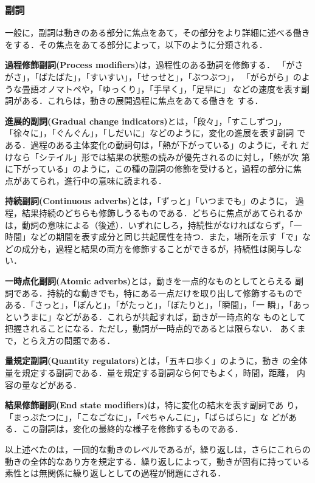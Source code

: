 \subsubsection{副詞}
\label{fukushi}

一般に，副詞は動きのある部分に焦点をあて，その部分をより詳細に述べる働き
をする．その焦点をあてる部分によって，以下のように分類される\cite{森山
  88}．

{\bf 過程修飾副詞(Process modifiers)}は，過程性のある動詞を修飾する．
「がさがさ」，「ばたばた」，「すいすい」，「せっせと」，「ぶつぶつ」，
「がらがら」のような畳語オノマトペや，「ゆっくり」，「手早く」，「足早に」
などの速度を表す副詞がある．これらは，動きの展開過程に焦点をあてる働きを
する．

{\bf 進展的副詞(Gradual change indicators)}とは，「段々」，「すこしずつ」，
「徐々に」，「ぐんぐん」，「しだいに」などのように，変化の進展を表す副詞
である．過程のある主体変化の動詞句は，「熱が下がっている」のように，それ
だけなら「シテイル」形では結果の状態の読みが優先されるのに対し，「熱が次
第に下がっている」のように，この種の副詞の修飾を受けると，過程の部分に焦
点があてられ，進行中の意味に読まれる．

{\bf 持続副詞(Continuous adverbs)}とは，「ずっと」「いつまでも」のように，
過程，結果持続のどちらも修飾しうるものである．どちらに焦点があてられるか
は，動詞の意味による（後述）．いずれにしろ，持続性がなければならず，「一
時間」などの期間を表す成分と同じ共起属性を持つ．また，場所を示す「で」な
どの成分も，過程と結果の両方を修飾することができるが，持続性は関与しない．

{\bf 一時点化副詞(Atomic adverbs)}とは，動きを一点的なものとしてとらえる
副詞である．持続的な動きでも，特にある一点だけを取り出して修飾するもので
ある．「さっと」，「ぽんと」，「がたっと」，「ぽたりと」，「瞬間」，「一
瞬」，「あっというまに」などがある．これらが共起すれば，動きが一時点的な
ものとして把握されることになる．ただし，動詞が一時点的であるとは限らない．
あくまで，とらえ方の問題である．

{\bf 量規定副詞(Quantity regulators)}とは，「五キロ歩く」のように，動き
の全体量を規定する副詞である．量を規定する副詞なら何でもよく，時間，距離，
内容の量などがある．

{\bf 結果修飾副詞(End state modifiers)}は，特に変化の結末を表す副詞であ
り，「まっぷたつに」，「こなごなに」，「ぺちゃんこに」，「ばらばらに」な
どがある．この副詞は，変化の最終的な様子を修飾するものである．

以上述べたのは，一回的な動きのレベルであるが，繰り返しは，さらにこれらの
動きの全体的なあり方を規定する．繰り返しによって，動きが固有に持っている
素性とは無関係に繰り返しとしての過程が問題にされる．

